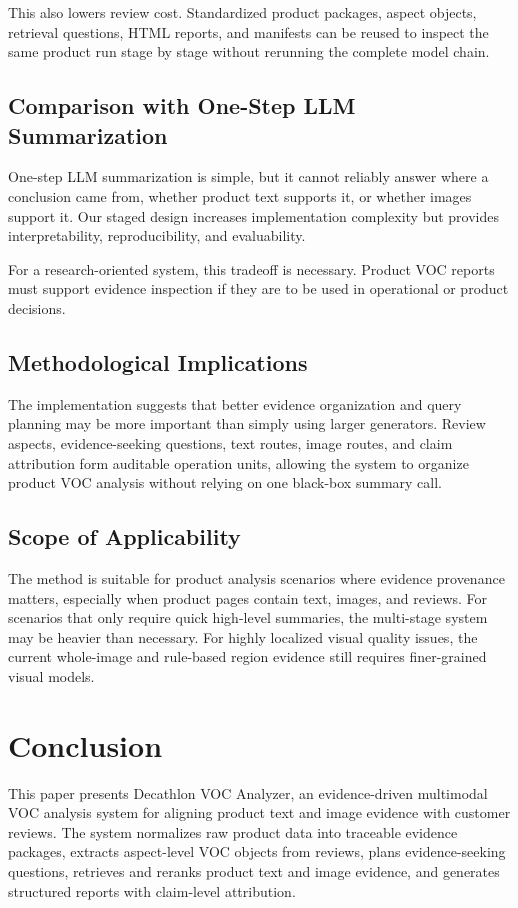 \documentclass[11pt]{article}
\begin{document}
This also lowers review cost. Standardized product packages, aspect objects, retrieval questions, HTML reports, and manifests can be reused to inspect the same product run stage by stage without rerunning the complete model chain.

\subsection{Comparison with One-Step LLM Summarization}

One-step LLM summarization is simple, but it cannot reliably answer where a conclusion came from, whether product text supports it, or whether images support it. Our staged design increases implementation complexity but provides interpretability, reproducibility, and evaluability.

For a research-oriented system, this tradeoff is necessary. Product VOC reports must support evidence inspection if they are to be used in operational or product decisions.

\subsection{Methodological Implications}

The implementation suggests that better evidence organization and query planning may be more important than simply using larger generators. Review aspects, evidence-seeking questions, text routes, image routes, and claim attribution form auditable operation units, allowing the system to organize product VOC analysis without relying on one black-box summary call.

\subsection{Scope of Applicability}

The method is suitable for product analysis scenarios where evidence provenance matters, especially when product pages contain text, images, and reviews. For scenarios that only require quick high-level summaries, the multi-stage system may be heavier than necessary. For highly localized visual quality issues, the current whole-image and rule-based region evidence still requires finer-grained visual models.

\section{Conclusion}
This paper presents Decathlon VOC Analyzer, an evidence-driven multimodal VOC analysis system for aligning product text and image evidence with customer reviews. The system normalizes raw product data into traceable evidence packages, extracts aspect-level VOC objects from reviews, plans evidence-seeking questions, retrieves and reranks product text and image evidence, and generates structured reports with claim-level attribution.
\end{document}
